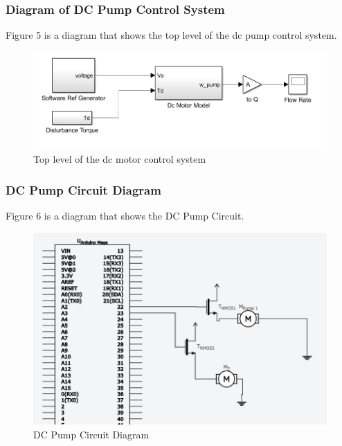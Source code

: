 \documentclass [10pt]{article}
\begin{document}

\subsubsection{Diagram of DC Pump Control System}
Figure 5 is a diagram that shows the top level of the dc pump control system. 
\begin{figure} [h!]
	\centering
	\includegraphics [scale = 0.6] {Figures/DC_PumpSim.png}
	\caption{Top level of the dc motor control system}
\end{figure}



\subsubsection{DC Pump Circuit Diagram}
Figure 6 is a diagram that shows the DC Pump Circuit.
\begin{figure} [h!]
	\centering
	\includegraphics [scale = 0.6] {Figures/Pump.png}
	\caption{DC Pump Circuit Diagram}
\end{figure}
\end{document}
